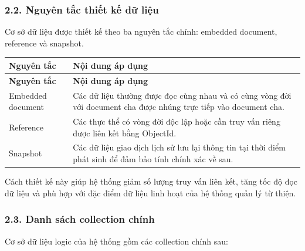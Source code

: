 \documentclass[12pt,a4paper]{article}
\begin{document}
\subsubsection*{2.2. Nguyên tắc thiết kế dữ liệu}

Cơ sở dữ liệu được thiết kế theo ba nguyên tắc chính: embedded document, reference và snapshot.

\begin{center}
\small
\begin{longtable}{|p{3.2cm}|p{9.3cm}|}
\hline
\textbf{Nguyên tắc} & \textbf{Nội dung áp dụng} \\ \hline
\endfirsthead
\hline
\textbf{Nguyên tắc} & \textbf{Nội dung áp dụng} \\ \hline
\endhead
Embedded document & Các dữ liệu thường được đọc cùng nhau và có cùng vòng đời với document cha được nhúng trực tiếp vào document cha. \\ \hline
Reference & Các thực thể có vòng đời độc lập hoặc cần truy vấn riêng được liên kết bằng ObjectId. \\ \hline
Snapshot & Các dữ liệu giao dịch lịch sử lưu lại thông tin tại thời điểm phát sinh để đảm bảo tính chính xác về sau. \\ \hline
\end{longtable}
\normalsize
\end{center}

Cách thiết kế này giúp hệ thống giảm số lượng truy vấn liên kết, tăng tốc độ đọc dữ liệu và phù hợp với đặc điểm dữ liệu linh hoạt của hệ thống quản lý từ thiện.

\subsubsection*{2.3. Danh sách collection chính}

Cơ sở dữ liệu logic của hệ thống gồm các collection chính sau:
\end{document}
